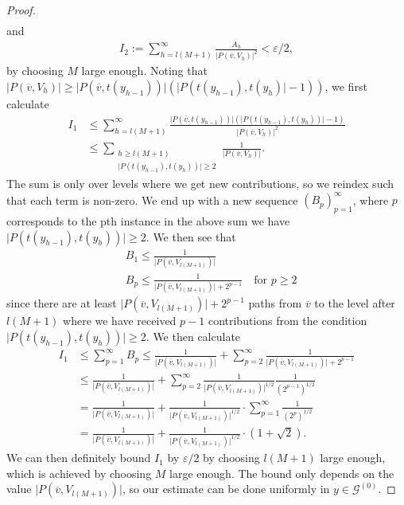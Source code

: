 \documentclass[11pt,a4paper,oneside,final,reqno]{amsart}
\theoremstyle{definition}
\newcommand{\Go}{\mathcal{G}^{(0)}}
\numberwithin{equation}{section}
\begin{document}
\begin{proof}
\begin{align*}
		\end{align*}
		and
		\begin{align*}
			I_2 := \sum_{h = l(M+1)}^{\infty} \frac{  A_h}{\vert P(\overline{v} , V_h) \vert^2} < \varepsilon/2,
		\end{align*}
		by choosing $M$ large enough. Noting that $\vert P(\overline{v} , V_h) \vert \geq \vert P(\overline{v}, t(y_{h-1}))\vert ( \vert P(t(y_{h-1}), t(y_{h}) \vert -1 )  )$, 
		we first calculate
		\begin{align*}
			I_1 &\leq \sum_{h = l(M+1)}^{\infty} \frac{ \vert P(\overline{v}, t(y_{h-1}))\vert ( \vert P(t(y_{h-1}), t(y_{h})) \vert -1 )   }{\vert P(\overline{v} , V_h) \vert^2} \\
			&\leq \sum_{\substack{h \geq l(M+1) \\ \vert P(t(y_{h-1}), t(y_h))\vert \geq 2 }} \frac{ 1}{\vert P(\overline{v} , V_h) \vert }.
		\end{align*}
		The sum is only over levels where we get new contributions, so we reindex such that each term is non-zero. We end up with a new sequence $(B_p)_{p=1}^{\infty}$, 
		where $p$ corresponds to the pth instance in the above sum we have  $\vert P(t(y_{h-1}), t(y_h))\vert \geq 2 $. We then see that
		\begin{align*}
			&B_1 \leq \frac{ 1}{\vert P(\overline{v} , V_{l(M+1)}) \vert } \\
			&B_p \leq \frac{ 1}{\vert P(\overline{v} , V_{l(M+1)}) \vert + 2^{p-1} } \quad \text{for $p \geq 2$}
		\end{align*}
		since there are at least $\vert P(\overline{v} , V_{l(M+1)}) \vert + 2^{p-1}$ paths from $\overline{v}$ to the level after $l(M+1)$ where we have received $p-1$ contributions from the condition $\vert P(t(y_{h-1}), t(y_h))\vert \geq 2$. We then calculate
		\begin{align*}
			I_1 &\leq \sum_{p=1}^\infty B_p \leq \frac{ 1}{\vert P(\overline{v} , V_{l(M+1)}) \vert } + \sum_{p=2}^\infty \frac{ 1}{\vert P(\overline{v} , V_{l(M+1)}) \vert + 2^{p-1} } \\
			&\leq \frac{ 1}{\vert P(\overline{v} , V_{l(M+1)}) \vert } + \sum_{p=2}^\infty \frac{ 1}{\vert P(\overline{v} , V_{l(M+1)}) \vert^{1/2} } \frac{1}{(2^{p-1})^{1/2}}\\
			&= \frac{1}{\vert P(\overline{v} , V_{l(M+1)}) \vert} + \frac{ 1}{\vert P(\overline{v} , V_{l(M+1)}) \vert^{1/2} } \cdot \sum_{p=1}^\infty  \frac{1}{(2^{p})^{1/2}} \\
			&= \frac{1}{\vert P(\overline{v} , V_{l(M+1)}) \vert} + \frac{ 1}{\vert P(\overline{v} , V_{l(M+1)}) \vert^{1/2} } \cdot (1 + \sqrt{2}).
		\end{align*}
		We 
		can 
		then
		definitely bound 
		$I_1$
		by $ \varepsilon/2$ by choosing ${l(M+1)}$ large enough, which is achieved by choosing $M$ large enough. The bound only depends on the value $\vert P(\overline{v} , V_{l(M+1)}) \vert$, so our estimate can be done uniformly in $y \in \Go$.  


\end{proof}
\end{document}
